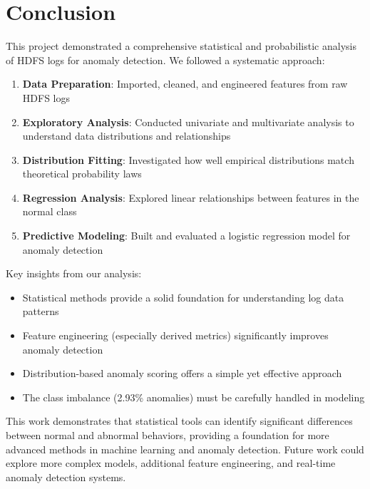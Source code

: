 \documentclass[12pt,a4paper]{article}
\theoremstyle{definition}
\theoremstyle{remark}
\begin{document}
\section{Conclusion}

This project demonstrated a comprehensive statistical and probabilistic analysis of HDFS logs for anomaly detection. We followed a systematic approach:

\begin{enumerate}
    \item \textbf{Data Preparation}: Imported, cleaned, and engineered features from raw HDFS logs
    \item \textbf{Exploratory Analysis}: Conducted univariate and multivariate analysis to understand data distributions and relationships
    \item \textbf{Distribution Fitting}: Investigated how well empirical distributions match theoretical probability laws
    \item \textbf{Regression Analysis}: Explored linear relationships between features in the normal class
    \item \textbf{Predictive Modeling}: Built and evaluated a logistic regression model for anomaly detection
\end{enumerate}

Key insights from our analysis:
\begin{itemize}
    \item Statistical methods provide a solid foundation for understanding log data patterns
    \item Feature engineering (especially derived metrics) significantly improves anomaly detection
    \item Distribution-based anomaly scoring offers a simple yet effective approach
    \item The class imbalance (2.93\% anomalies) must be carefully handled in modeling
\end{itemize}

This work demonstrates that statistical tools can identify significant differences between normal and abnormal behaviors, providing a foundation for more advanced methods in machine learning and anomaly detection. Future work could explore more complex models, additional feature engineering, and real-time anomaly detection systems.
\end{document}
